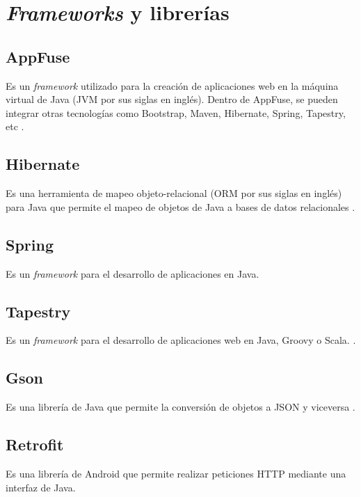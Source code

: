 \section{\textit{Frameworks} y librerías} \label{Frameworks y librerias}

\subsection{AppFuse}
Es un \textit{framework} utilizado para la creación de aplicaciones web en la máquina virtual de Java (JVM por sus siglas en inglés). Dentro de AppFuse, se pueden integrar otras tecnologías como Bootstrap, Maven, Hibernate, Spring, Tapestry, etc \cite{APF1}.

\subsection{Hibernate}
Es una herramienta de mapeo objeto-relacional (ORM por sus siglas en inglés) para Java que permite el mapeo de objetos de Java a bases de datos relacionales \cite{HBR1}.

\subsection{Spring}
Es un \textit{framework} para el desarrollo de aplicaciones en Java.

\subsection{Tapestry}
Es un \textit{framework} para el desarrollo de aplicaciones web en Java, Groovy o Scala.  \cite{ATP1}.

\subsection{Gson}
Es una librería de Java que permite la conversión de objetos a JSON y viceversa \cite{GSN1}
.
\subsection{Retrofit}
Es una librería de Android que permite realizar peticiones HTTP mediante una interfaz de Java\cite{RFT1}.